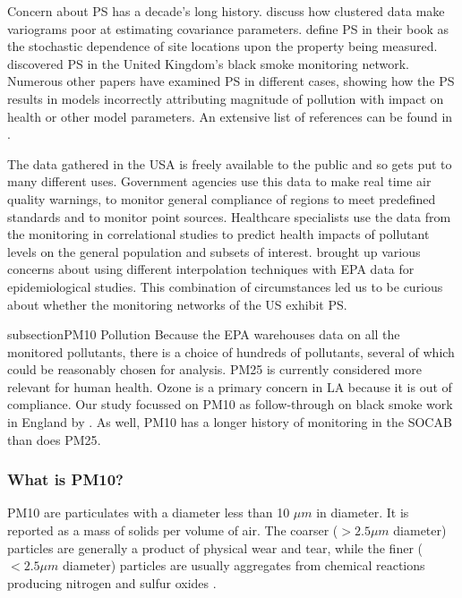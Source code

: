 \documentclass{article}
\begin{document}
Concern about \ac{PS} has a decade's long history. \citet{isaaks1988spatial} discuss how clustered data make variograms poor at estimating covariance parameters. \cite{diggle:07} define \ac{PS} in their book as the stochastic dependence of site locations upon the property being measured. \cite{shaddick2012preferential} discovered  \ac{PS} in the United Kingdom's black smoke monitoring network. Numerous other papers have examined \ac{PS} in different cases, showing how the \ac{PS} results in models incorrectly attributing magnitude of pollution with impact on health or other model parameters.  An extensive list of references can be found in \citep{Zidek:2012}.  

The data gathered in the USA is freely available to the public and so gets put to many different uses.  Government agencies use this data to make real time air quality warnings, to monitor general compliance of regions to meet predefined standards and to monitor point sources.  Healthcare specialists use the data from the monitoring in correlational studies to predict health impacts of pollutant levels on the general population and subsets of interest.  \cite{wong2004comparison} brought up various concerns about using different interpolation techniques with \ac{EPA} data for epidemiological studies.  This combination of circumstances led us to be curious about whether the monitoring networks of the US exhibit \ac{PS}.


subsection{PM10 Pollution}
\label{sec:pm10}
Because the \ac{EPA} warehouses data on all the monitored pollutants, there is a choice of hundreds of pollutants, several of which could be reasonably chosen for analysis.  \ac{PM25} is currently considered more relevant for human health.  Ozone is a primary concern in LA because it is out of compliance.   Our study focussed on \ac{PM10} as  follow-through on black smoke work in England by \cite{zidek2010monitoring}.  As well, \ac{PM10} has a longer history of monitoring in the \ac{SOCAB} than does \ac{PM25}.
    
\subsubsection*{What is PM10?}
\label{subsubsec:pm10nature}
\ac{PM10} are particulates with a diameter less than 10 $\mu m$ in diameter.  It is reported as a mass of solids per volume of air.  The coarser ($> 2.5 \mu m$ diameter) particles are generally a product of physical wear and tear, while the finer ($< 2.5 \mu m$ diameter) particles are usually aggregates from chemical reactions producing nitrogen and sulfur oxides
.
\end{document}
